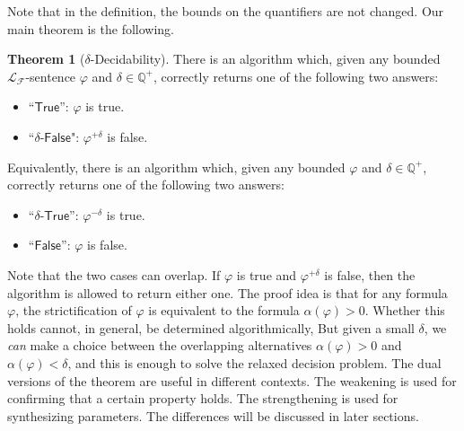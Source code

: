 \documentclass[10pt]{article}
\theoremstyle{definition}
\newtheorem{theorem}{Theorem}[section]
\begin{document}
Note that in the definition, the bounds on the quantifiers are not changed. Our main theorem is the following. 
\begin{theorem}[$\delta$-Decidability]\label{main}
There is an algorithm which, given any bounded $\mathcal{L}_{\mathcal{F}}$-sentence $\varphi$ and $\delta\in \mathbb{Q}^+$, correctly returns one of the following two answers:
\begin{itemize}
\item ``$\mathsf{True}$'': $\varphi$ is true. 
\item ``$\delta$-$\mathsf{False}$": $\varphi^{+\delta}$ is false. 
\end{itemize}
Equivalently, there is an algorithm which, given any bounded $\varphi$ and $\delta\in \mathbb{Q}^+$, correctly returns one of the following two answers:
\begin{itemize}
\item ``$\delta$-$\mathsf{True}$'': $\varphi^{-\delta}$ is true. 
\item ``$\mathsf{False}$'': $\varphi$ is false. 
\end{itemize}
\end{theorem}
Note that the two cases can overlap. If $\varphi$ is true and $\varphi^{+\delta}$ is false, then the algorithm is allowed to return either one. The proof idea is that for any formula $\varphi$, the strictification of $\varphi$ is equivalent to the formula $\alpha(\varphi) > 0$. Whether this holds cannot, in general, be determined algorithmically, But given a small $\delta$, we {\em can} make a choice between the overlapping alternatives $\alpha(\varphi) > 0$ and $\alpha(\varphi) < \delta$, and this is enough to solve the relaxed decision problem. The dual versions of the theorem are useful in different contexts. The weakening is used for confirming that a certain property holds. The strengthening is used for synthesizing parameters. The differences will be discussed in later sections. 
\end{document}
